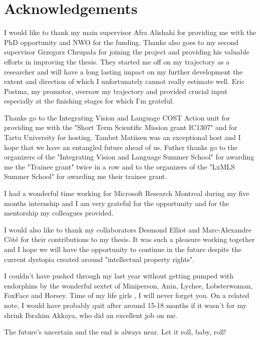 {}

\chapter*{Acknowledgements}

I would like to thank my main supervisor  Afra Alishahi for providing me with the PhD opportunity 
and NWO for the funding. Thanks also goes to my second supervisor Grzegorz Chrupała for joining the project
and providing his valuable efforts in improving the thesis. 
They started me off on my trajectory as a researcher and will have a long lasting 
impact on my further development the extent and direction of which I unfortunately cannot really estimate well.
Eric Postma, my promotor, oversaw my trajectory and provided crucial input especially at the finishing stages
for which I'm grateful. 

Thanks go to the Integrating Vision and Language COST Action unit for providing me with the
"Short Term Scientific Mission grant IC1307" and for Tartu University for hosting. 
Tambet Matiisen was an exceptional host and I hope that we have an entangled future ahead of us.
Futher thanks go to the organizers of the "Integrating Vision and Language Summer School" for 
awarding me the "Trainee grant" twice in a row and to the organizers of the "LxMLS Summer School"
for awarding me their trainee grant. 

I had a wonderful time working for Microsoft Research Montreal during my five months internship
and I am very grateful for the opportunity and for the mentorship my colleagues provided.

I would also like to thank my collaborators Desmond Elliot and Marc-Alexandre Côté for their contributions
to my thesis. It was such a pleasure working together and I hope we will have the opportunity to continue in the
future despite the current dystopia created around "intellectual property rights".


I couldn't have pushed through my last year without getting pumped with endorphins 
by the wonderful sextet of Miniperson, Anin, Lychee, Lobsterwoman, FoxFace and Horsey. 
Time of my life girls , I will never forget you.  
On a related note, I would have probably quit after around 15-18 months if it wasn't for my shrink 
Ibrahim Akkaya, who did an excellent job on me. 

The future's uncertain and the end is always near. Let it roll, baby, roll!




